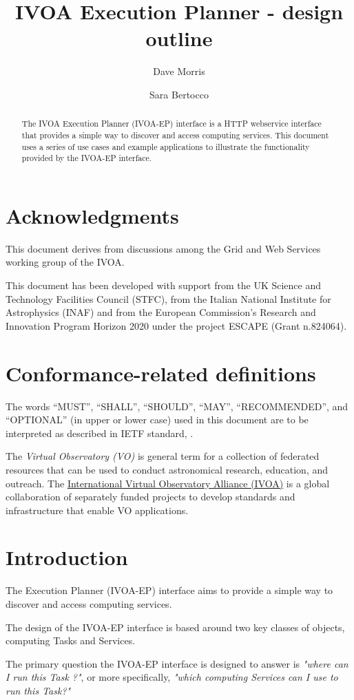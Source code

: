 \documentclass[11pt,a4paper]{ivoa}
\title{IVOA Execution Planner - design outline}
\author[https://wiki.ivoa.net/twiki/bin/view/IVOA/DaveMorris]{Dave Morris}
\author[https://wiki.ivoa.net/twiki/bin/view/IVOA/SaraBertocco]{Sara Bertocco}
\newcommand{\webservice} {webservice\xspace}
\newcommand{\ivoa} {IVOA\xspace}
\newcommand{\ivoep} {IVOA-EP\xspace}
\begin{document}
\begin{abstract}
The \ivoa Execution Planner (\ivoep) interface is a HTTP \webservice interface that provides a simple way to discover and access computing services. This document uses a series of use cases and example applications to illustrate the functionality provided by the \ivoep interface.
\end{abstract}

\section*{Acknowledgments}
\label{sec:acknowledgments}
This document derives from discussions among the Grid and Web Services working group of the IVOA.

This document has been developed with support from the UK Science and Technology Facilities Council (STFC), from the Italian National Institute for Astrophysics (INAF) and from the European Commission's Research and Innovation Program Horizon 2020 under the project ESCAPE (Grant n.824064).

\section*{Conformance-related definitions}
\label{sec:conformance-related-definitions}
The words ``MUST'', ``SHALL'', ``SHOULD'', ``MAY'', ``RECOMMENDED'', and ``OPTIONAL'' (in upper or lower case) used in this document are to be interpreted as described in IETF standard, \citep{std:RFC2119}.

The \emph{Virtual Observatory (VO)} is general term for a collection of federated resources that can be used
to conduct astronomical research, education, and outreach.
The \href{http://www.ivoa.net}{International
Virtual Observatory Alliance (IVOA)} is a global
collaboration of separately funded projects to develop standards and infrastructure that enable VO applications.

\section{Introduction}
\label{sec:introduction}
The Execution Planner (\ivoep) interface aims to provide a simple way to discover and access computing services.

The design of the \ivoep interface is based around two key classes of objects, computing Tasks and Services.

The primary question the \ivoep interface is designed to answer is \textit{"where can I run this Task ?"}, or more specifically, \textit{"which computing Services can I use to run this Task?"}
\end{document}
